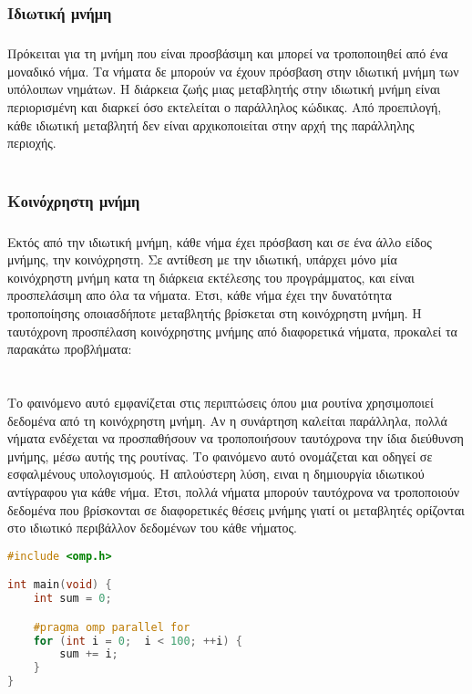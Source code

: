 \subsubsection{Ιδιωτική μνήμη}
\subparagraph{}
Πρόκειται για τη μνήμη που είναι προσβάσιμη και μπορεί να τροποποιηθεί από ένα μοναδικό νήμα. Τα νήματα δε μπορούν να έχουν πρόσβαση στην ιδιωτική μνήμη των υπόλοιπων νημάτων. Η διάρκεια ζωής μιας μεταβλητής στην ιδιωτική μνήμη είναι περιορισμένη και διαρκεί όσο εκτελείται ο παράλληλος κώδικας. Από προεπιλογή, κάθε ιδιωτική μεταβλητή δεν είναι αρχικοποιείται στην αρχή της παράλληλης περιοχής\cite{thenextstep9}.
\ \\
\ \\
\subsubsection{Κοινόχρηστη μνήμη}
\subparagraph{}
Εκτός από την ιδιωτική μνήμη, κάθε νήμα έχει πρόσβαση και σε ένα άλλο είδος μνήμης, την  κοινόχρηστη. Σε αντίθεση με την ιδιωτική, υπάρχει μόνο μία κοινόχρηστη μνήμη κατα τη διάρκεια εκτέλεσης του προγράμματος, και είναι προσπελάσιμη απο όλα τα νήματα. Ετσι, κάθε νήμα έχει την δυνατότητα τροποποίησης οποιασδήποτε μεταβλητής βρίσκεται στη κοινόχρηστη μνήμη.
Η ταυτόχρονη προσπέλαση κοινόχρηστης μνήμης από διαφορετικά νήματα, προκαλεί τα παρακάτω προβλήματα:
\clearpage
\paragraph{}
\begin{center}
	\begin{minipage}[t]{0.45\linewidth}
\ \\
	Το φαινόμενο αυτό εμφανίζεται στις περιπτώσεις όπου μια ρουτίνα χρησιμοποιεί δεδομένα από τη κοινόχρηστη μνήμη. 
Αν η συνάρτηση καλείται παράλληλα, πολλά νήματα ενδέχεται να προσπαθήσουν να τροποποιήσουν ταυτόχρονα την ίδια διεύθυνση μνήμης, μέσω αυτής της ρουτίνας. Το φαινόμενο αυτό ονομάζεται \emph{} και οδηγεί σε εσφαλμένους υπολογισμούς. Η απλούστερη λύση, ειναι η δημιουργία ιδιωτικού αντίγραφου για κάθε νήμα. Έτσι, πολλά νήματα μπορούν ταυτόχρονα να τροποποιούν δεδομένα που βρίσκονται σε διαφορετικές θέσεις μνήμης γιατί οι μεταβλητές ορίζονται στο ιδιωτικό περιβάλλον δεδομένων του κάθε νήματος.
	\end{minipage}
	\qquad
	\begin{minipage}[t]{0.47\linewidth}
		\begin{lstlisting}[tabsize=2, basicstyle=\small, language=C++, caption={\el{Παράδειγμα κώδικα με} race condition}, frame=tb]
#include <omp.h>

int main(void) {	
	int sum = 0;

	#pragma omp parallel for
	for (int i = 0;  i < 100; ++i) {
		sum += i;		
	}
}
\end{lstlisting}
	\end{minipage}
\end{center}
\ \\
